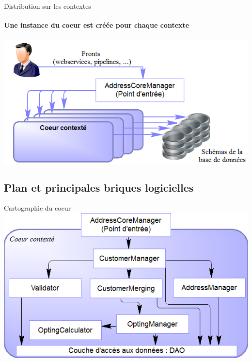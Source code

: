 \documentclass[compact]{beamer}%
\begin{document}
\begin{frame}{Distribution sur les contextes}
	\framesubtitle{Une instance du coeur est créée pour chaque contexte}
	\includegraphics[width=\textwidth]{images/rc_arch_contexts.png}
\end{frame}


\subsection{Plan et principales briques logicielles}

\begin{frame}{Cartographie du coeur}
	\includegraphics[width=\textwidth]{images/rc_arch_business.png}
\end{frame}
\end{document}
